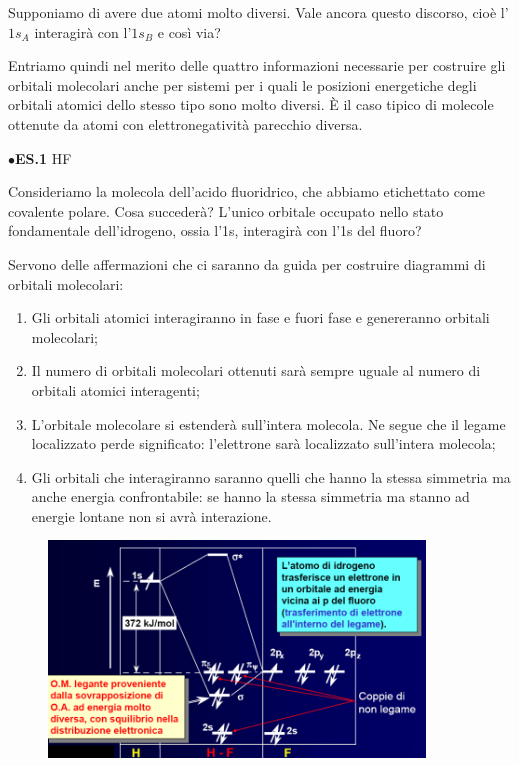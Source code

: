 Supponiamo di avere due atomi molto diversi. Vale ancora questo discorso, cioè l'$1s_A$ interagirà con l'$1s_B$ e così via?

Entriamo quindi nel merito delle quattro informazioni necessarie per costruire gli orbitali molecolari anche per sistemi per i quali le posizioni energetiche degli orbitali atomici dello stesso tipo sono molto diversi. È il caso tipico di molecole ottenute da atomi con elettronegatività parecchio diversa.

\vspace{0.2cm}$\bullet$\textbf{ES.1} HF

Consideriamo la molecola dell'acido fluoridrico, che abbiamo etichettato come covalente polare. Cosa succederà? L'unico orbitale occupato nello stato fondamentale dell'idrogeno, ossia l'1s, interagirà con l'1s del fluoro?

\vspace{0.2cm}Servono delle affermazioni che ci saranno da guida per costruire diagrammi di orbitali molecolari:

\begin{enumerate}
    \item Gli orbitali atomici interagiranno in fase e fuori fase e genereranno orbitali molecolari;
    \item Il numero di orbitali molecolari ottenuti sarà sempre uguale al numero di orbitali atomici interagenti;
    \item L'orbitale molecolare si estenderà sull'intera molecola. Ne segue che il legame localizzato perde significato: l'elettrone sarà localizzato sull'intera molecola;
    \item Gli orbitali che interagiranno saranno quelli che hanno la stessa simmetria ma anche energia confrontabile: se hanno la stessa simmetria ma stanno ad energie lontane non si avrà interazione.
\end{enumerate}

\begin{figure}[htp]
    \centering
    \includegraphics[width=10cm]{immagini/orbitali_molecolari_HF.png}
\end{figure}

